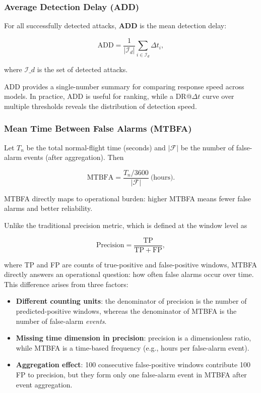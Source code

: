 \documentclass{ieeeaccess}
\begin{document}
\subsubsection{Average Detection Delay (ADD)}

For all successfully detected attacks, \textbf{ADD} is the mean detection delay:

\begin{equation}
\mathrm{ADD} = \frac{1}{|\mathcal{I}_d|}\sum_{i\in \mathcal{I}_d} \Delta t_i,
\end{equation}

where \(\mathcal{I}\_d\) is the set of detected attacks.

ADD provides a single-number summary for comparing response speed across models. In practice, ADD is useful for ranking, while a DR@$\Delta t$ curve over multiple thresholds reveals the distribution of detection speed.

\subsubsection{Mean Time Between False Alarms (MTBFA)}

Let \(T_n\) be the total normal-flight time (seconds) and \(|\mathcal{F}|\) be the number of false-alarm events (after aggregation). Then

\begin{equation}
\mathrm{MTBFA} = \frac{T_n/3600}{|\mathcal{F}|}\ \text{(hours)}.
\end{equation}

MTBFA directly maps to operational burden: higher MTBFA means fewer false alarms and better reliability.

Unlike the traditional precision metric, which is defined at the window level as

\begin{equation}
\mathrm{Precision} = \frac{\mathrm{TP}}{\mathrm{TP}+\mathrm{FP}},
\end{equation}

where TP and FP are counts of true-positive and false-positive windows, MTBFA directly answers an operational question: how often false alarms occur over time. This difference arises from three factors:

\begin{itemize}
\item \textbf{Different counting units}: the denominator of precision is the number of predicted-positive windows, whereas the denominator of MTBFA is the number of false-alarm \emph{events}.
\item \textbf{Missing time dimension in precision}: precision is a dimensionless ratio, while MTBFA is a time-based frequency (e.g., hours per false-alarm event).
\item \textbf{Aggregation effect}: 100 consecutive false-positive windows contribute 100 FP to precision, but they form only one false-alarm event in MTBFA after event aggregation.
\end{itemize}
\end{document}
